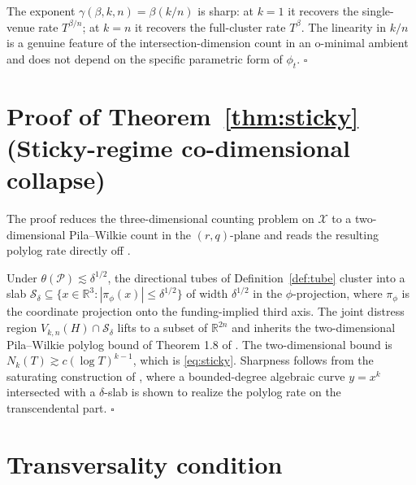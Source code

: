 \documentclass[12pt]{article}
\theoremstyle{sampledef}
\theoremstyle{sampleplain}
\theoremstyle{sampleremark}
\newcommand{\R}{\mathbb{R}}
\newcommand{\1}{\mathbf{1}}
\begin{document}
The exponent $\gamma(\beta,k,n) = \beta(k/n)$ is sharp: at $k = 1$
it recovers the single-venue rate $T^{\beta/n}$; at $k = n$ it recovers the
full-cluster rate $T^\beta$. The linearity in $k/n$ is a genuine
feature of the intersection-dimension count in an o-minimal
ambient and does not depend on the specific parametric form of
$\phi_t$. $\square$

\section{Proof of Theorem~\ref{thm:sticky} (Sticky-regime
co-dimensional collapse)}\label{app:thm-sticky}

The proof reduces the three-dimensional counting problem on
$\mathcal{X}$ to a two-dimensional Pila--Wilkie count in the
$(r,q)$-plane and reads the resulting polylog rate directly off
\citet[Theorem 1.8]{PilaWilkie2006}.

Under $\theta(\mathcal{P}) \lesssim \delta^{1/2}$, the directional
tubes of Definition~\ref{def:tube} cluster into a slab
$\mathcal{S}_\delta \subseteq
\{x \in \R^3 : |\pi_\phi(x)| \le \delta^{1/2}\}$
of width $\delta^{1/2}$ in the $\phi$-projection, where $\pi_\phi$
is the coordinate projection onto the funding-implied third axis.
The joint distress region $V_{k,n}(H) \cap \mathcal{S}_\delta$
lifts to a subset of $\R^{2n}$ and inherits the two-dimensional
Pila--Wilkie polylog bound of Theorem 1.8 of
\citet{PilaWilkie2006}. The two-dimensional bound is
$N_k(T) \gtrsim c(\log T)^{k-1}$,
which is \eqref{eq:sticky}. Sharpness follows from the saturating construction of
\citet[\S 5]{Pila2011ManinMumford}, where a bounded-degree algebraic
curve $y = x^k$ intersected with a $\delta$-slab is shown to
realize the polylog rate on the transcendental part. $\square$

\section{Transversality condition}\label{app:trans}
\end{document}
